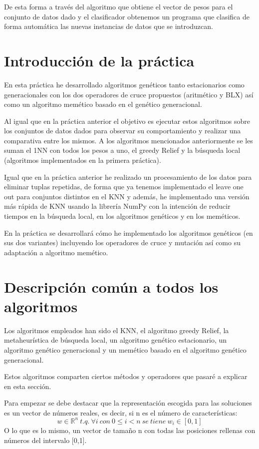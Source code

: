 \documentclass[12pt,a4paper]{article}
\begin{document}
	De esta forma a través del algoritmo que obtiene el vector de pesos para el conjunto de datos dado y el clasificador obtenemos un programa que clasifica de forma automática las nuevas instancias de datos que se introduzcan.


	\section{Introducción de la práctica}
	\label{sec:introPractica}

	En esta práctica he desarrollado algoritmos genéticos tanto estacionarios como generacionales con los dos operadores de cruce propuestos (aritmético y BLX) así como un algoritmo memético basado en el genético generacional.

	Al igual que en la práctica anterior el objetivo es ejecutar estos algoritmos sobre los conjuntos de datos dados para observar su comportamiento y realizar una comparativa entre los mismos. A los algoritmos mencionados anteriormente se les suman el 1NN con todos los pesos a uno, el greedy Relief y la búsqueda local (algoritmos implementados en la primera práctica).

	Igual que en la práctica anterior he realizado un procesamiento de los datos para eliminar tuplas repetidas, de forma que ya tenemos implementado el leave one out para conjuntos distintos en el KNN y además, he implementado una versión más rápida de KNN usando la librería NumPy con la intención de reducir tiempos en la búsqueda local, en los algoritmos genéticos y en los meméticos.

	En la práctica se desarrollará cómo he implementado los algoritmos genéticos (en sus dos variantes) incluyendo los operadores de cruce y mutación así como su adaptación a algoritmo memético.

	\newpage

	\section{Descripción común a todos los algoritmos}

	Los algoritmos empleados han sido el KNN, el algoritmo greedy Relief, la metaheurística de búsqueda local, un algoritmo genético estacionario, un algoritmo genético generacional y un memético basado en el algoritmo genético generacional.

	Estos algoritmos comparten ciertos métodos y operadores que pasaré a explicar en esta sección.

	Para empezar se debe destacar que la representación escogida para las soluciones es un vector de números reales, es decir, si n es el número de características:
	$$w\in \mathbb{R}^n \ t.q. \ \forall i \ con \ 0\leq i < n \ se \ tiene \ w_i \in [0,1]$$
	O lo que es lo mismo, un vector de tamaño n con todas las posiciones rellenas con números del intervalo [0,1].
\end{document}
